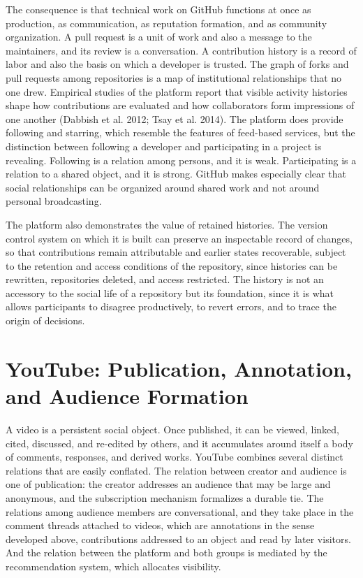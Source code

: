 \documentclass[11pt]{article}
\theoremstyle{remark}
\begin{document}
The consequence is that technical work on GitHub functions at once as production, as communication, as reputation formation, and as community organization. A pull request is a unit of work and also a message to the maintainers, and its review is a conversation. A contribution history is a record of labor and also the basis on which a developer is trusted. The graph of forks and pull requests among repositories is a map of institutional relationships that no one drew. Empirical studies of the platform report that visible activity histories shape how contributions are evaluated and how collaborators form impressions of one another (Dabbish et al. 2012; Tsay et al. 2014). The platform does provide following and starring, which resemble the features of feed-based services, but the distinction between following a developer and participating in a project is revealing. Following is a relation among persons, and it is weak. Participating is a relation to a shared object, and it is strong. GitHub makes especially clear that social relationships can be organized around shared work and not around personal broadcasting.

The platform also demonstrates the value of retained histories. The version control system on which it is built can preserve an inspectable record of changes, so that contributions remain attributable and earlier states recoverable, subject to the retention and access conditions of the repository, since histories can be rewritten, repositories deleted, and access restricted. The history is not an accessory to the social life of a repository but its foundation, since it is what allows participants to disagree productively, to revert errors, and to trace the origin of decisions.

\section{YouTube: Publication, Annotation, and Audience Formation}

A video is a persistent social object. Once published, it can be viewed, linked, cited, discussed, and re-edited by others, and it accumulates around itself a body of comments, responses, and derived works. YouTube combines several distinct relations that are easily conflated. The relation between creator and audience is one of publication: the creator addresses an audience that may be large and anonymous, and the subscription mechanism formalizes a durable tie. The relations among audience members are conversational, and they take place in the comment threads attached to videos, which are annotations in the sense developed above, contributions addressed to an object and read by later visitors. And the relation between the platform and both groups is mediated by the recommendation system, which allocates visibility.
\end{document}
